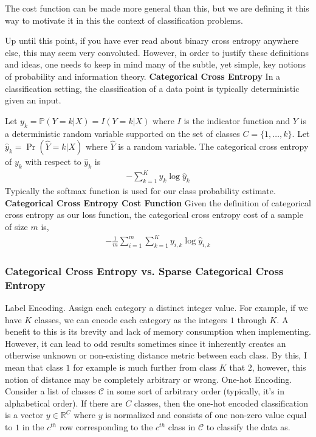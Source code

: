 \documentclass[12pt]{article}
\theoremstyle{definition}
\numberwithin{equation}{section}
\newcommand{\Pro}{\ensuremath{\mathbb{P}}}
\newcommand{\R}{\ensuremath{\mathbb{R}}}
\begin{document}
The cost function can be made more general than this, but we are defining it this way to motivate it in this the context of classification problems.

Up until this point, if you have ever read about binary cross entropy anywhere else, this may seem very convoluted. However, in order to justify these definitions and ideas, one needs to keep in mind many of the subtle, yet simple, key notions of probability and information theory.
 \textbf{Categorical Cross Entropy}
 In a classification setting, the classification of a data point is typically deterministic given an input.
 
 Let $y_k = \Pro(Y=k|X) = I(Y = k|X)$ where $I$ is the indicator function and $Y$ is a deterministic random variable supported on the set of classes $C = \{1, \ldots, k\}$. Let $\hat y_k = \Pr(\hat Y = k|X) $ where $\hat Y$ is a random variable. The categorical cross entropy of $y_k$ with respect to $\hat y_k$ is
 \begin{gather*}
     -\sum_{k=1}^K y_{k}\log \hat y_k
 \end{gather*}
 Typically the softmax function is used for our class probability estimate.
  \textbf{Categorical Cross Entropy Cost Function}
Given the definition of categorical cross entropy as our loss function, the categorical cross entropy cost of a sample of size $m$ is,
 \begin{gather*}
     -\frac{1}{m}\sum_{i=1}^m\sum_{k=1}^K y_{i,k}\log \hat y_{i,k}
 \end{gather*}
 
\subsubsection{Categorical Cross Entropy vs. Sparse Categorical Cross Entropy}
 Label Encoding.
Assign each category a distinct integer value. For example, if we have $K$ classes, we can encode each category as the integers $1$ through $K$. A benefit to this is its brevity and lack of memory consumption when implementing. However, it can lead to odd results sometimes since it inherently creates an otherwise unknown or non-existing distance metric between each class. By this, I mean that class $1$ for example is much further from class $K$ that $2$, however, this notion of distance may be completely arbitrary or wrong.
 One-hot Encoding. Consider a list of classes $\mathcal{C}$ in some sort of arbitrary order (typically, it's in alphabetical order). If there are $C$ classes, then the one-hot encoded classification is a vector $y\in \R^C$ where $y$ is normalized and consists of one non-zero value equal to $1$ in the $c^{th}$ row corresponding to the $c^{th}$ class in $\mathcal{C}$ to classify the data as.
\end{document}
